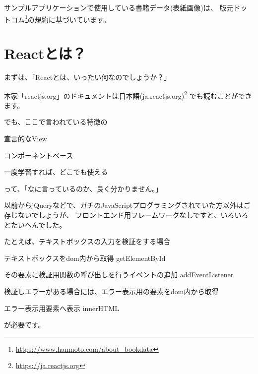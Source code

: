 サンプルアプリケーションで使用している書籍データ(表紙画像)は、
版元ドットコム\footnote{\url{https://www.hanmoto.com/about_bookdata}}の規約に基づいています。

\section{Reactとは？}
\keeplastskip{
  \label{sec:3-1}
  \label{sec-031React}
  \par\nobreak
}

まずは、「Reactとは、いったい何なのでしょうか？」

\vspace*{\baselineskip}

本家「reactjs.org」のドキュメントは日本語(ja.reactjs.org)\footnote{\url{https://ja.reactjs.org}}
でも読むことができます。

でも、ここで言われている特徴の\\[0pt]

\begin{starteritemize}
\item 宣言的なView
\item コンポーネントベース
\item 一度学習すれば、どこでも使える
\end{starteritemize}

って、「なに言っているのか、良く分かりません。」

\vspace*{\baselineskip}

以前からjQueryなどで、ガチのJavaScriptプログラミングされていた方以外はご存じないでしょうが、
フロントエンド用フレームワークなしですと、いろいろとたいへんでした。

\vspace*{\baselineskip}

たとえば、テキストボックスの入力を検証をする場合\\[0pt]

\begin{starterenumerate}
\item テキストボックスをdom内から取得 getElementById
\item その要素に検証用関数の呼び出しを行うイベントの追加 addEventListener
\item 検証しエラーがある場合には、エラー表示用の要素をdom内から取得
\item エラー表示用要素へ表示 innerHTML
\end{starterenumerate}

が必要です。

